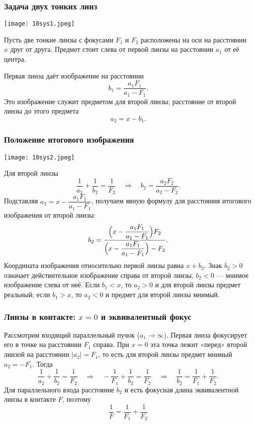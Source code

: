 \documentclass[12pt, a4paper]{article}%
\begin{document}
\subsubsection*{Задача двух тонких линз}

\begin{center}
\texttt{[image: 10sys1.jpeg]}
\label{fig:mpr}
\end{center}

Пусть две тонкие линзы с фокусами \(F_1\) и \(F_2\) расположены на оси на 
расстоянии \(x\) друг от друга.
Предмет стоит слева от первой линзы на расстоянии \(a_1\) от её центра.

Первая линза даёт изображение на расстоянии
\[
b_1=\frac{a_1F_1}{a_1-F_1}.
\]
Это изображение служит предметом для второй линзы; расстояние от второй линзы до этого предмета
\[
a_2=x-b_1.
\]

\subsubsection*{Положение итогового изображения}

\begin{center}
\texttt{[image: 10sys2.jpeg]}
\label{fig:mpr}
\end{center}

Для второй линзы
\[
\frac{1}{a_2}+\frac{1}{b_2}=\frac{1}{F_2}\quad\Rightarrow\quad b_2=\frac{a_2F_2}{a_2-F_2}.
\]
Подставляя \(a_2=x-\dfrac{a_1F_1}{a_1-F_1}\), получаем явную формулу для расстояния итогового изображения от второй линзы:
\[
b_2=\frac{\Bigl(x-\dfrac{a_1F_1}{a_1-F_1}\Bigr)F_2}{\Bigl(x-\dfrac{a_1F_1}{a_1-F_1}\Bigr)-F_2}.
\]
Координата изображения относительно первой линзы равна \(x+b_2\). Знак \(b_2>0\)
означает действительное изображение справа от второй линзы, \(b_2<0\) — 
мнимое изображение слева от неё. Если \(b_1 < x\), то \(a_2 > 0\) и для второй линзы предмет реальный; если \(b_1>x\), то \(a_2<0\) и предмет для второй линзы мнимый.

\subsubsection*{Линзы в контакте: \(x=0\) и эквивалентный фокус}
Рассмотрим входящий параллельный пучок (\(a_1\to\infty\)). Первая линза фокусирует его в точке на расстоянии \(F_1\) справа. При \(x=0\) эта точка лежит «перед» второй линзой на расстоянии \(|a_2|=F_1\), то есть для второй линзы предмет мнимый \(a_2=-F_1\). Тогда
\[
\frac{1}{a_2}+\frac{1}{b_2}=\frac{1}{F_2}
\quad\Rightarrow\quad
-\frac{1}{F_1}+\frac{1}{b_2}=\frac{1}{F_2}
\quad\Rightarrow\quad
\frac{1}{b_2}=\frac{1}{F_1}+\frac{1}{F_2}.
\]
Для параллельного входа расстояние \(b_2\) и есть фокусная длина эквивалентной линзы в контакте \(F\), поэтому
\[
\boxed{\ \frac{1}{F}=\frac{1}{F_1}+\frac{1}{F_2}\ }
\]
\end{document}

